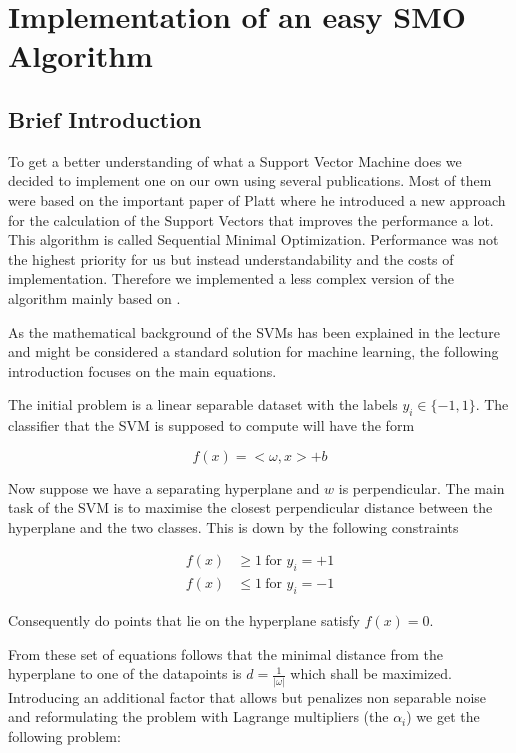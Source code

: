 \section{Implementation of an easy SMO Algorithm}
\subsection{Brief Introduction}
To get a better understanding of what a Support Vector Machine does we decided to implement one on our own using several publications. Most of them were based on the important paper of Platt \cite{platt} where he introduced a new approach for the calculation of the Support Vectors that improves the performance a lot. This algorithm is called Sequential Minimal Optimization. Performance was not the highest priority for us but instead understandability and the costs of implementation. Therefore we implemented a less complex version of the algorithm mainly based on \cite{smo}.

As the mathematical background of the SVMs has been explained in the lecture and might be considered a standard solution for machine learning, the following introduction focuses on the main equations.

The initial problem is a linear separable dataset with the labels $y_i \in \{-1, 1\}$. The classifier that the SVM is supposed to compute will have the form

\begin{equation}
    f(x) = <\omega, x> + b
\end{equation}

Now suppose we have a separating hyperplane and $w$ is perpendicular. The main task of the SVM is to maximise the closest perpendicular distance between the hyperplane and the two classes. This is down by the following constraints

\begin{align}
f(x) &\geq 1\ \text{for $y_i = +1$} \\
f(x) &\leq 1\ \text{for $y_i = -1$}
\end{align}

Consequently do points that lie on the hyperplane satisfy $f(x)=0$.

From these set of equations follows that the minimal distance from the hyperplane to one of the datapoints is $d=\frac{1}{|\omega|}$ which shall be maximized. Introducing an additional factor that allows but penalizes non separable noise and reformulating the problem with Lagrange multipliers (the $\alpha _i$) we get the following problem:


